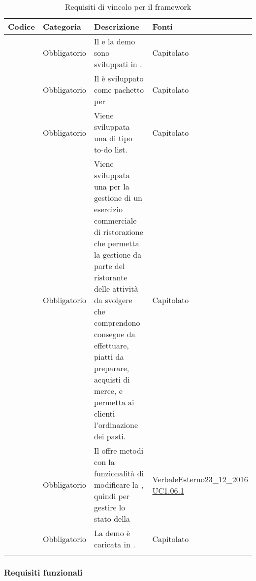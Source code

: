 \begin{longtable}{|P{1.5cm}|P{2.5cm}|P{6.5cm}|P{2.5cm}|}
	\hline \textbf{Codice} & \textbf{Categoria} & \textbf{Descrizione} & \textbf{Fonti} \\
	\hline \RequisitoObV\label{L1} & Obbligatorio & Il  e la demo sono sviluppati in . & Capitolato \\
	\hline \RequisitoObV \label{L2} & Obbligatorio & Il  è sviluppato come pachetto per  & Capitolato \\
	\hline \RequisitoObV\label{L3} & Obbligatorio & Viene sviluppata una  di tipo to-do list. & Capitolato \\
	\hline \RequisitoObV\label{L4} & Obbligatorio & Viene sviluppata una  per la gestione di un esercizio commerciale di ristorazione che permetta la gestione da parte del ristorante delle attività da svolgere che comprendono consegne da effettuare,  piatti da preparare, acquisti di merce, e permetta ai clienti l'ordinazione dei pasti. & Capitolato \\
	\hline \RequisitoObV\label{L5} & Obbligatorio & Il  offre metodi con la funzionalità di modificare la , quindi per gestire lo stato della  & VerbaleEsterno23\_12\_2016 \linebreak \hyperref[UC1.06.1]{UC1.06.1}  \\
	\hline \RequisitoObV\label{L54} & Obbligatorio & La demo è caricata in . & Capitolato \\
	\hline
	\caption{Requisiti di vincolo per il framework}
\end{longtable}

\subsubsection{Requisiti funzionali}

